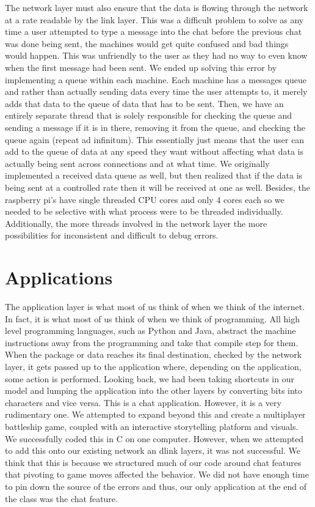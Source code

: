 \documentclass[10pt, letterpaper, twocolumn]{article}
\begin{document}
The network layer must also ensure that the data is flowing through the network at a rate readable by the link layer. This was a difficult problem to solve as any time a user attempted to type a message into the chat before the previous chat was done being sent, the machines would get quite confused and bad things would happen. This was unfriendly to the user as they had no way to even know when the first message had been sent. We ended up solving this error by implementing a queue within each machine. Each machine has a messages queue and rather than actually sending data every time the user attempts to, it merely adds that data to the queue of data that has to be sent. Then, we have an entirely separate thread that is solely responsible for checking the queue and sending a message if it is in there, removing it from the queue, and checking the queue again (repeat ad infinitum). This essentially just means that the user can add to the queue of data at any speed they want without affecting what data is actually being sent across connections and at what time. We originally implemented a received data queue as well, but then realized that if the data is being sent at a controlled rate then it will be received at one as well. Besides, the raspberry pi’s have single threaded CPU cores and only 4 cores each so we needed to be selective with what process were to be threaded individually. Additionally, the more threads involved in the network layer the more possibilities for inconsistent and difficult to debug errors. 


\section{Applications}
The application layer is what most of us think of when we think of the internet. In fact, it is what most of us think of when we think of programming. All high level programming languages, such as Python and Java, abstract the machine instructions away from the programming and take that compile step for them. When the package or data reaches its final destination, checked by the network layer, it gets passed up to the application where, depending on the application, some action is performed. Looking back, we had been taking shortcuts in our model and lumping the application into the other layers by converting bits into characters and vice versa. This is a chat application. However, it is a very rudimentary one. We attempted to expand beyond this and create a multiplayer battleship game, coupled with an interactive storytelling platform and visuals. We successfully coded this in C on one computer. However, when we attempted to add this onto our existing network an dlink layers, it was not successful. We think that this is because we structured much of our code around chat features that pivoting to game moves affected the behavior. We did not have enough time to pin down the source of the errors and thus, our only application at the end of the class was the chat feature. 
\end{document}
